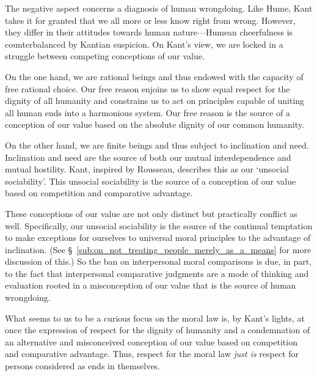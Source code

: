 \documentclass[a4paper,12pt]{article}
\begin{document}
The negative aspect concerns a diagnosis of human wrongdoing. Like Hume, Kant takes it for granted that we all more or less know right from wrong. However, they differ in their attitudes towards human nature---Humean cheerfulness is counterbalanced by Kantian suspicion. On Kant's view, we are locked in a struggle between competing conceptions of our value. 

On the one hand, we are rational beings and thus endowed with the capacity of free rational choice. Our free reason enjoins us to show equal respect for the dignity of all humanity and constrains us to act on principles capable of uniting all human ends into a harmonious system. Our free reason is the source of a conception of our value based on the absolute dignity of our common humanity. 

On the other hand, we are finite beings and thus subject to inclination and need. Inclination and need are the source of both our mutual interdependence and mutual hostility. Kant, inspired by Rousseau, describes this as our `unsocial sociability'. This unsocial sociability is the source of a conception of our value based on competition and comparative advantage. 

These conceptions of our value are not only distinct but practically conflict as well. Specifically, our unsocial sociability is the source of the continual temptation to make exceptions for ourselves to universal moral principles to the advantage of inclination. (See \S~\ref{sub:on_not_treating_people_merely_as_a_means} for more discussion of this.) So the ban on interpersonal moral comparisons is due, in part, to the fact that interpersonal comparative judgments are a mode of thinking and evaluation rooted in a misconception of our value that is the source of human wrongdoing.

What seems to us to be a curious focus on the moral law is, by Kant's lights, at once the expression of respect for the dignity of humanity and a condemnation of an alternative and misconceived conception of our value based on competition and comparative advantage. Thus, respect for the moral law \emph{just is} respect for persons considered as ends in themselves.
\end{document}
